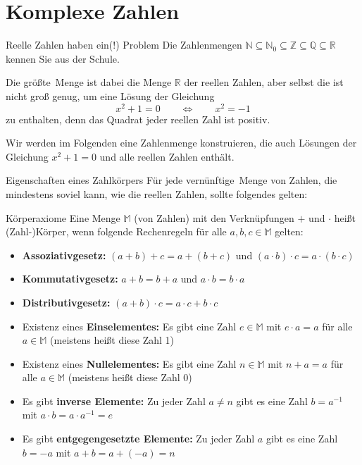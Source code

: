 \section{Komplexe Zahlen}
\begin{frame}{Reelle Zahlen haben ein(!) Problem}
	Die Zahlenmengen $\mathbb{N} \subseteq \mathbb{N}_{0} \subseteq \mathbb{Z} \subseteq \mathbb{Q} \subseteq \mathbb{R}$ kennen Sie aus der Schule.
	
	Die \glqq größte\grqq\, Menge ist dabei die Menge $\mathbb{R}$ der reellen Zahlen, aber selbst die ist nicht groß genug, um eine Lösung der Gleichung
	$$
	x^{2} + 1 = 0 \qquad \Leftrightarrow \qquad x^{2} = -1
	$$ 
	zu enthalten, denn das Quadrat jeder reellen Zahl ist positiv.
	
	Wir werden im Folgenden eine Zahlenmenge konstruieren, die auch Lösungen der Gleichung $x^{2}+1=0$ und alle reellen Zahlen enthält.
\end{frame}
\begin{frame}{Eigenschaften eines Zahlkörpers}
	Für jede \glqq vernünftige\grqq\, Menge von Zahlen, die mindestens soviel kann, wie die reellen Zahlen, sollte folgendes gelten:
\footnotesize{	\begin{block}{Körperaxiome}
		Eine Menge $\mathbb{M}$ (von Zahlen) mit den Verknüpfungen $+$ und $\cdot$ heißt (Zahl-)Körper, wenn folgende Rechenregeln für alle $a, b, c \in \mathbb{M}$ gelten:
		\begin{itemize}
			\item \textbf{Assoziativgesetz:} $(a+b) + c = a + ( b + c)$ und $(a\cdot b)\cdot c = a\cdot (b\cdot c)$
			\item \textbf{Kommutativgesetz:} $a+b = b+a$ und $a\cdot b = b \cdot a$
			\item \textbf{Distributivgesetz:} $(a+b)\cdot c = a\cdot c + b \cdot c$
			\item Existenz eines \textbf{Einselementes:} Es gibt eine Zahl $e \in \mathbb{M}$ mit $e \cdot a = a$ für alle $a\in \mathbb{M}$ (meistens heißt diese Zahl 1)
			\item Existenz eines \textbf{Nullelementes:} Es gibt eine Zahl $n \in \mathbb{M}$ mit $n + a = a$ für alle $a\in \mathbb{M}$ (meistens heißt diese Zahl 0)
			\item Es gibt \textbf{inverse Elemente:} Zu jeder Zahl $a\neq n$ gibt es eine Zahl $b = a^{-1}$ mit $a\cdot b = a \cdot a^{-1} = e$
			\item Es gibt \textbf{entgegengesetzte Elemente:} Zu jeder Zahl $a$ gibt es eine Zahl $b = -a$ mit $a + b = a + (-a) = n$
		\end{itemize} 
	\end{block}}
\end{frame}
